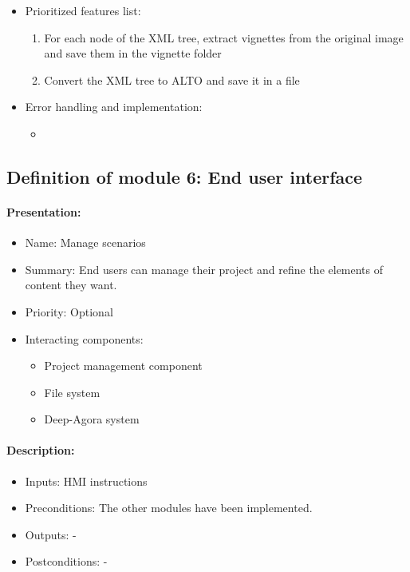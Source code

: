 \documentclass{polytech/polytech}
\numberwithin{figure}{chapter}
\begin{document}
\begin{appendix}
\begin{itemize}
    \item Prioritized features list: 
    \begin{enumerate}
        \item	For each node of the XML tree, extract vignettes from the original image and save them in the vignette folder
        \item	Convert the XML tree to ALTO and save it in a file
    \end{enumerate}
    \item Error handling and implementation: 
    \begin{itemize}
        \item	
    \end{itemize}
\end{itemize}


\subsection{Definition of module 6: End user interface}

\paragraph{Presentation:}
 
\begin{itemize}
    \item Name: Manage scenarios
    \item Summary: End users can manage their project and refine the elements of content they want.
    \item Priority: Optional
    \item Interacting components:
    \begin{itemize}
        \item Project management component
        \item File system
        \item Deep-Agora system
    \end{itemize}
\end{itemize}

\paragraph{Description:}
 
\begin{itemize}
    \item Inputs: HMI instructions
    \item Preconditions: The other modules have been implemented.
    \item Outputs: -
    \item Postconditions: -
\end{itemize}


\end{appendix}
\end{document}
